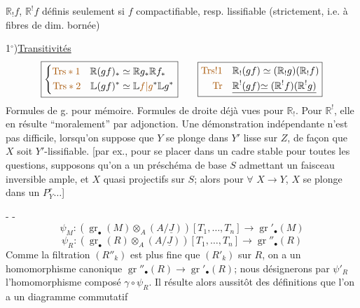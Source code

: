 $\mathbb{R}_!f$, $\mathbb{R}^!f$ définis seulement si $f$ compactifiable,
resp. lissifiable (strictement, i.e. 
à fibres de dim. bornée)

1$^\circ$)\quad \uline{Transitivités}
\[
\begin{array}{c@{\qquad}c}
\boxed{\left\{\begin{aligned}
\deleted{\unsure{\mathrm{Trs}*1}}\quad \mathbb{R}(gf)_*&\simeq \mathbb{R}g_*\mathbb{R}f_*\\
\unsure{\mathrm{Trs}*2}\quad \mathbb{L}(gf)^*&\simeq \mathbb{L}\unsure{f|g}^*\mathbb{L}g^*
\end{aligned}\right.}
&
\boxed{\begin{aligned}
\unsure{\mathrm{Trs}!1}\quad \mathbb{R}_!(gf)&\simeq(\mathbb{R}_!g)(\mathbb{R}_!f)\\
\unsure{\mathrm{Tr}}\quad \underline{\mathbb{R}^!(gf)}&\underline{\simeq(\mathbb{R}^!f)(\mathbb{R}^!g)}
\end{aligned}}
\end{array}
\]
Formules de g. pour mémoire. Formules de
droite déjà vues pour $\mathbb{R}_!$. Pour $\mathbb{R}^!$, elle
en résulte ``moralement'' par adjonction. Une
démonstration indépendante n'est pas difficile,
lorsqu'on suppose que $Y$ se plonge dans
$Y'$ lisse sur $Z$, de façon que
$X$ soit $Y'$-lissifiable.
[par ex.,
pour se placer dans un cadre
stable pour toutes les questions, supposons
qu'on a un préschéma de base
$S$ admettant un faisceau inversible ample,
et 
$X$ quasi projectifs sur $S$; alors
pour $\forall$ $X\longrightarrow Y$, $X$ se plonge dans un
$P_Y^r\ldots$]

-  -
\[
\psi_M:(\operatorname{gr}_\bullet(M)\otimes_A(A/\underline J))[T_1,\ldots,T_n]
 \longrightarrow\operatorname{gr}'_\bullet(M)
\]
\[
\psi_R:(\operatorname{gr}_\bullet(R)\otimes_A(A/\underline J))[T_1,\ldots,T_n]
 \longrightarrow\operatorname{gr}''_\bullet(R)
\]
Comme la  filtration $(R''_k)$ est plus fine que $(R'_k)$ sur $R$, on a un
homomorphisme canonique \inserted{$\gamma:$}
$\operatorname{gr}''_\bullet(R)\longrightarrow\operatorname{gr}'_\bullet(R)$;
nous désignerons par $\psi'_R$
l'homomorphisme composé $\gamma\circ\psi_R$. Il résulte alors aussitôt des définitions
que l'on a un diagramme commutatif

